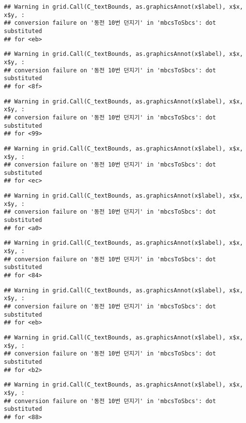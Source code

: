\documentclass[]{book}
\begin{document}
\begin{verbatim}
## Warning in grid.Call(C_textBounds, as.graphicsAnnot(x$label), x$x, x$y, :
## conversion failure on '동전 10번 던지기' in 'mbcsToSbcs': dot substituted
## for <eb>
\end{verbatim}

\begin{verbatim}
## Warning in grid.Call(C_textBounds, as.graphicsAnnot(x$label), x$x, x$y, :
## conversion failure on '동전 10번 던지기' in 'mbcsToSbcs': dot substituted
## for <8f>
\end{verbatim}

\begin{verbatim}
## Warning in grid.Call(C_textBounds, as.graphicsAnnot(x$label), x$x, x$y, :
## conversion failure on '동전 10번 던지기' in 'mbcsToSbcs': dot substituted
## for <99>
\end{verbatim}

\begin{verbatim}
## Warning in grid.Call(C_textBounds, as.graphicsAnnot(x$label), x$x, x$y, :
## conversion failure on '동전 10번 던지기' in 'mbcsToSbcs': dot substituted
## for <ec>
\end{verbatim}

\begin{verbatim}
## Warning in grid.Call(C_textBounds, as.graphicsAnnot(x$label), x$x, x$y, :
## conversion failure on '동전 10번 던지기' in 'mbcsToSbcs': dot substituted
## for <a0>
\end{verbatim}

\begin{verbatim}
## Warning in grid.Call(C_textBounds, as.graphicsAnnot(x$label), x$x, x$y, :
## conversion failure on '동전 10번 던지기' in 'mbcsToSbcs': dot substituted
## for <84>
\end{verbatim}

\begin{verbatim}
## Warning in grid.Call(C_textBounds, as.graphicsAnnot(x$label), x$x, x$y, :
## conversion failure on '동전 10번 던지기' in 'mbcsToSbcs': dot substituted
## for <eb>
\end{verbatim}

\begin{verbatim}
## Warning in grid.Call(C_textBounds, as.graphicsAnnot(x$label), x$x, x$y, :
## conversion failure on '동전 10번 던지기' in 'mbcsToSbcs': dot substituted
## for <b2>
\end{verbatim}

\begin{verbatim}
## Warning in grid.Call(C_textBounds, as.graphicsAnnot(x$label), x$x, x$y, :
## conversion failure on '동전 10번 던지기' in 'mbcsToSbcs': dot substituted
## for <88>
\end{verbatim}
\end{document}

